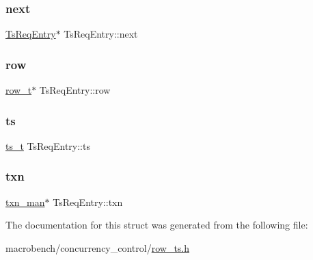 \mbox{\label{structTsReqEntry_a2d6e423abd7d5bf97b6608765ff9516e}} 
\subsubsection{\texorpdfstring{next}{next}}
{\footnotesize\ttfamily \hyperlink{structTsReqEntry}{Ts\+Req\+Entry}$\ast$ Ts\+Req\+Entry\+::next}

\mbox{\label{structTsReqEntry_a2709b20b4ac97c51966b35fffcf54e4b}} 
\subsubsection{\texorpdfstring{row}{row}}
{\footnotesize\ttfamily \hyperlink{classrow__t}{row\+\_\+t}$\ast$ Ts\+Req\+Entry\+::row}

\mbox{\label{structTsReqEntry_ac5cd49323863c4a9d2ecb4fa1bb72691}} 
\subsubsection{\texorpdfstring{ts}{ts}}
{\footnotesize\ttfamily \hyperlink{global_8h_aaf095dfc9b10f757c968fe146ad7e724}{ts\+\_\+t} Ts\+Req\+Entry\+::ts}

\mbox{\label{structTsReqEntry_a3079fb0bec061e9e11182063cfabfc04}} 
\subsubsection{\texorpdfstring{txn}{txn}}
{\footnotesize\ttfamily \hyperlink{classtxn__man}{txn\+\_\+man}$\ast$ Ts\+Req\+Entry\+::txn}



The documentation for this struct was generated from the following file\+:\begin{DoxyCompactItemize}
\item 
macrobench/concurrency\+\_\+control/\hyperlink{row__ts_8h}{row\+\_\+ts.\+h}\end{DoxyCompactItemize}
